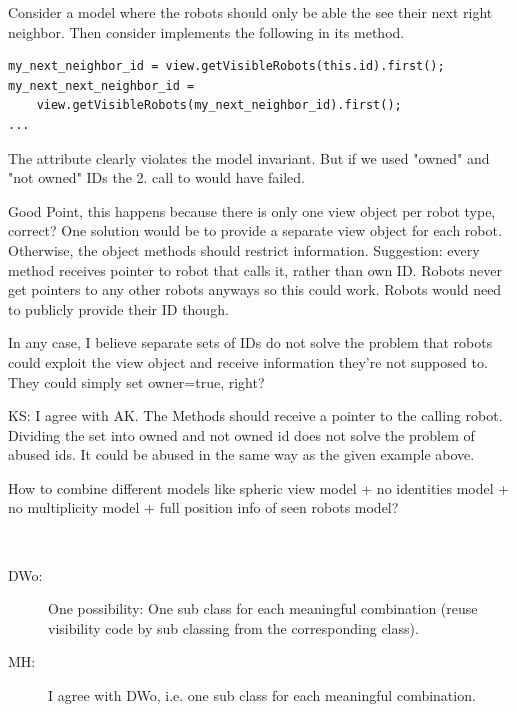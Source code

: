 \begin{appendix}
\begin{resolution}
\begin{description}
	\item [DWo@MH:] Consider a model where the robots should only be able the see their next right neighbor. Then consider  implements the following in its  method.
	\lstset{language=C++}
\begin{lstlisting}
my_next_neighbor_id = view.getVisibleRobots(this.id).first();
my_next_next_neighbor_id = 
	view.getVisibleRobots(my_next_neighbor_id).first();
...
\end{lstlisting}
		The attribute  clearly violates the model invariant. But if we used "owned" and "not owned" IDs the 2. call to  would have failed.
	\item [AK:] Good Point, this happens because there is only one view object per robot type, correct? One solution would be to provide a separate view object for each robot. Otherwise, the  object methods should restrict information. Suggestion: every  method receives pointer to robot that calls it, rather than own ID. Robots never get pointers to any other robots anyways so this could work. Robots would need to publicly provide their ID though.\par
	In any case, I believe separate sets of IDs do not solve the problem that robots could exploit the view object and receive information they're not supposed to. They could simply set owner=true, right?

	\item KS: I  agree with AK. The  Methods should receive a pointer to the calling robot. Dividing the set into owned and not owned id does not solve the problem of abused ids. It could be abused in the same way as the given example above. 
\end{description}
\end{resolution}

\begin{designQuestion}
\label{combine}
	How to combine different models like spheric view model + no identities model + no multiplicity model + full position info of seen robots model? 
\end{designQuestion}
\begin{resolution}~
\begin{description}
	\item [DWo:] One possibility: One sub class for each meaningful combination (reuse visibility code by sub classing from the corresponding class). 
	
	\item [MH:] I agree with DWo, i.e. one sub class for each meaningful combination.
	

\end{description}
\end{resolution}
\end{appendix}

